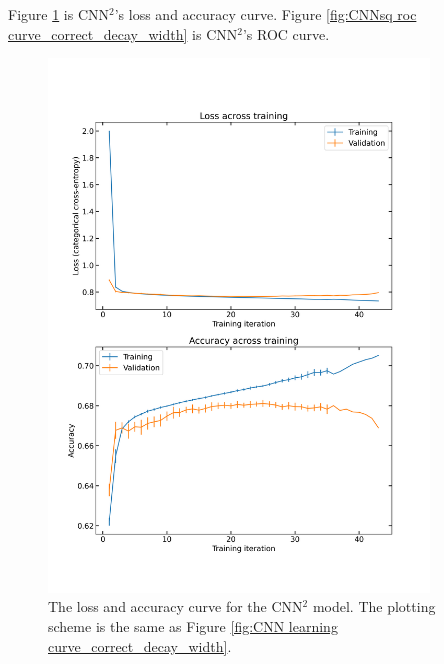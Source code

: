 \documentclass[12pt]{article}
\begin{document}
		Figure \ref{fig:CNNsq learning curve_correct_decay_width} is CNN${}^2$'s loss and accuracy curve. Figure \ref{fig:CNNsq roc curve_correct_decay_width} is CNN${}^2$'s ROC curve.
		\begin{figure}[htpb]
			\centering
			\includegraphics[width=0.90\textwidth]{CNNsq_loss_and_accuracy_correct_width.png}
			\caption{The loss and accuracy curve for the CNN$^2$ model. The plotting scheme is the same as Figure \ref{fig:CNN learning curve_correct_decay_width}.}
			\label{fig:CNNsq learning curve_correct_decay_width}
		\end{figure}
\end{document}
